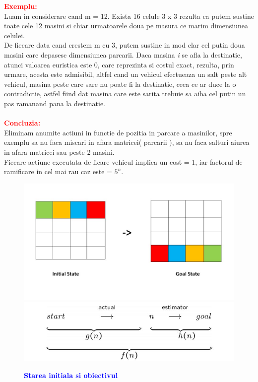\documentclass{article}
\begin{document}
\textbf{\textcolor{red}{Exemplu: \\}} 
Luam in considerare cand m = 12. Exista 16 celule 3 x 3 rezulta ca putem sustine toate cele 12 masini si chiar urmatoarele doua pe masura ce marim dimensiunea celulei.\\
De fiecare data cand crestem m cu 3, putem sustine in mod clar cel putin doua
masini care depasesc dimensiunea parcarii. Daca masina \emph i se afla la destinatie, atunci valoarea euristica este 0, care reprezinta si  costul exact, rezulta, prin urmare, acesta este admisibil, altfel cand un vehicul efectueaza un salt peste alt vehicul, masina peste care sare nu poate fi la destinatie, ceea ce ar duce la o contradictie, astfel fiind dat masina care este sarita trebuie sa aiba cel putin un pas ramanand pana la destinatie. \\\\
\textbf{\textcolor{red}{Concluzia: \\}} 
Eliminam anumite actiuni in functie de pozitia in parcare a masinilor, spre exemplu sa nu faca miscari in afara matricei( parcarii ), sa nu faca salturi aiurea in afara matricei sau peste 2 masini.\\
Fiecare actiune executata de ficare vehicul implica un cost = 1, iar factorul de ramificare in cel mai rau caz este = $5^n$.\\
\par
\newpage
\begin{figure}
\sffamily
    \centering
    \includegraphics[width=16cm]{stare-initiala-si-obiectiv.jpg}\\[0.5cm]
    \includegraphics[width=15cm]{abordare-functie.JPG}
    \bfseries\caption{\textbf{\textcolor{blue}{Starea initiala si obiectivul }}}
\end{figure}
\newpage
\end{document}
